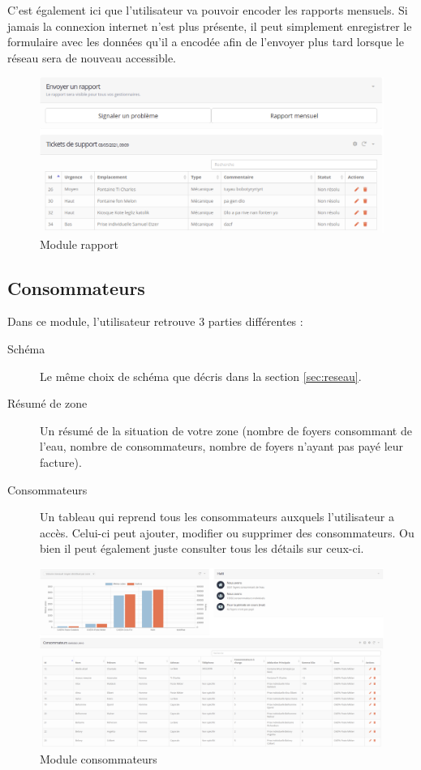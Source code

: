 \documentclass{EPL-master-thesis-covers-FR}
\begin{document}
				C'est également ici que l'utilisateur va pouvoir encoder les rapports mensuels. Si jamais la connexion internet n'est plus présente, il peut simplement enregistrer le formulaire avec les données qu'il a encodée afin de l'envoyer plus tard lorsque le réseau sera de nouveau accessible.
				
				\begin{figure}[H]
					\centering
					\includegraphics[width=1\textwidth]{images/report}
					\caption{Module rapport}
				\end{figure}
			
			\subsection{Consommateurs}
				Dans ce module, l'utilisateur retrouve 3 parties différentes :
				\begin{description}
					\item[Schéma] Le même choix de schéma que décris dans la section \ref{sec:reseau}.
					\item[Résumé de zone] Un résumé de la situation de votre zone (nombre de foyers consommant de l'eau, nombre de consommateurs, nombre de foyers n'ayant pas payé leur facture).
					\item[Consommateurs] Un tableau qui reprend tous les consommateurs auxquels l'utilisateur a accès. Celui-ci peut ajouter, modifier ou supprimer des consommateurs. Ou bien il peut également juste consulter tous les détails sur ceux-ci.
				\end{description}

				
				\begin{figure}[H]
					\centering
					\includegraphics[width=1\textwidth]{images/consumer}
					\caption{Module consommateurs}
				\end{figure}
				
\end{document}
